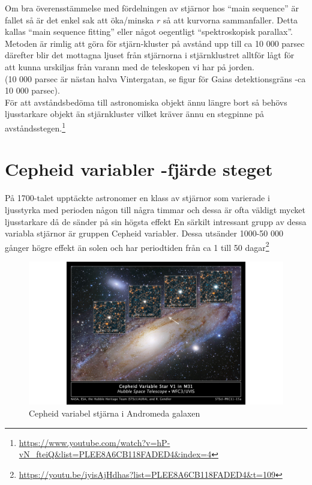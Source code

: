 \documentclass[./exercises.tex]{subfiles}
\begin{document}
 Om bra överensstämmelse med fördelningen av stjärnor hos
``main sequence'' är fallet så är det enkel sak att öka/minska $r$ så att kurvorna sammanfaller.
Detta kallas ``main sequence fitting'' eller något oegentligt ``spektroskopisk parallax''.
Metoden är rimlig att göra för stjärn-kluster på avstånd upp till ca 10 000 parsec därefter blir det mottagna ljuset från stjärnorna
i stjärnklustret alltför lågt för att kunna urskiljas från varann med de teleskopen vi har på jorden.\\
(10 000 parsec är nästan halva Vintergatan, se figur för Gaias detektionsgräns -ca 10 000 parsec).\\
För att avståndsbedöma till astronomiska objekt ännu längre bort så behövs ljusstarkare objekt än stjärnkluster vilket
kräver ännu en stegpinne på avståndsstegen.\footnote{\url{https://www.youtube.com/watch?v=hP-vN_fteiQ&list=PLEE8A6CB118FADED4&index=4}}


\section{Cepheid variabler -fjärde steget}

På 1700-talet upptäckte astronomer en klass av stjärnor som varierade i ljusstyrka med perioden någon till 
några timmar och dessa är ofta väldigt mycket ljusstarkare då de sänder på sin högsta effekt
En särkilt intressant grupp av dessa variabla stjärnor är gruppen Cepheid variabler.
Dessa utsänder 1000-50 000 gånger högre effekt än solen och har periodtiden
från ca 1 till 50 dagar\footnote{\url{https://youtu.be/iyisAjHdhas?list=PLEE8A6CB118FADED4&t=109}}\\
\begin{figure}[H]
\begin{center}
  \includegraphics[width=\linewidth]{Cepheid.jpg}
  \caption{Cepheid variabel stjärna i Andromeda galaxen}
  \end{center}
  \label{fig4}
\end{figure}
\end{document}
